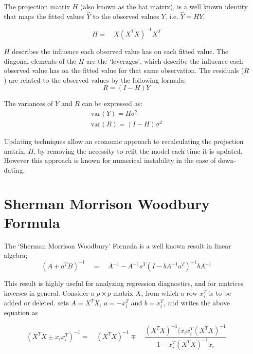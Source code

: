 \documentclass[12pt, a4paper]{report}
\theoremstyle{plain}
\theoremstyle{definition}
\theoremstyle{remark}
\begin{document}
The projection matrix $H$ (also known as the hat matrix), is a
well known identity that maps the fitted values $\hat{Y}$ to the
observed values $Y$, i.e. $\hat{Y} = HY$.


\begin{equation}
H =\quad X(X^{T}X)^{-1}X^{T}
\end{equation}


$H$ describes the influence each observed value has on each fitted
value. The diagonal elements of the $H$ are the `leverages', which
describe the influence each observed value has on the fitted value
for that same observation. The residuals ($R$) are related to the
observed values by the following formula:
\begin{equation}
R = (I-H)Y
\end{equation}


The variances of $Y$ and $R$ can be expressed as:
\begin{eqnarray}
\mbox{var}(Y) = H\sigma^{2} \nonumber\\
\mbox{var}(R) = (I-H)\sigma^{2}
\end{eqnarray}


Updating techniques allow an economic approach to recalculating
the projection matrix, $H$, by removing the necessity to refit the
model each time it is updated. However this approach is known for
numerical instability in the case of down-dating.


\section{Sherman Morrison Woodbury Formula} %


The `Sherman Morrison Woodbury' Formula is a well known result in
linear algebra;
\begin{equation}
(A+a^{T}B)^{-1} \quad = \quad A^{-1}-
A^{-1}a^{T}(I-bA^{-1}a^{T})^{-1}bA^{-1}
\end{equation}


This result is highly useful for analyzing regression diagnostics,
and for matrices inverses in general. Consider a $p \times p$
matrix $X$, from which a row $x_{i}^{T}$ is to be added or
deleted. \citet{CookWeisberg} sets $A = X^{T}X$, $a=-x_{i}^{T}$
and $b=x_{i}^{T}$, and writes the above equation as


\begin{equation}
(X^{T}X \pm x_{i}x_{i}^{T})^{-1} = \quad(X^{T}X )^{-1} \mp \quad
\frac{(X^{T}X)^{-1}(x_{i}x_{i}^{T}(X^{T}X)^{-1}}{1-x_{i}^{T}(X^{T}X)^{-1}x_{i}}
\end{equation}
\end{document}
